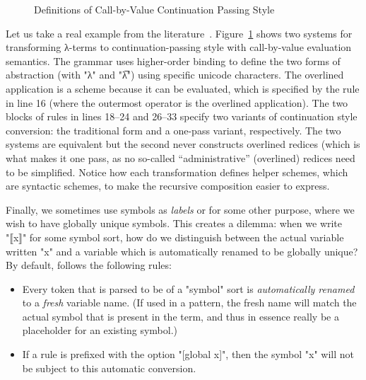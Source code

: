 \documentclass[11pt]{article} %
\begin{document}
\begin{figure}[p]
  \caption{Definitions of Call-by-Value Continuation Passing Style}
  \label{fig:cps}
\end{figure}

\begin{example}
  Let us take a real example from the literature~\cite{DanvyRose:rta1998}.  Figure~\ref{fig:cps}
  shows two systems for transforming λ-terms to continuation-passing style with call-by-value
  evaluation semantics. The grammar uses higher-order binding to define the two forms of abstraction
  (with "λ" and "λ̅") using specific unicode characters. The overlined application is a scheme
  because it can be evaluated, which is specified by the rule in line 16 (where the outermost
  operator is the overlined application). The two blocks of rules in lines 18--24 and 26--33 specify
  two variants of continuation style conversion: the traditional form and a one-pass variant,
  respectively. The two systems are equivalent but the second never constructs overlined redices
  (which is what makes it one pass, as no so-called ``administrative'' (overlined) redices need to
  be simplified. Notice how each transformation defines helper schemes, which are syntactic schemes,
  to make the recursive composition easier to express.
\end{example}

Finally, we sometimes use symbols as \emph{labels} or for some other purpose, where we wish to have
globally unique symbols. This creates a dilemma: when we write "⟦x⟧" for some symbol sort, how do we
distinguish between the actual variable written "x" and a variable which is automatically renamed to
be globally unique? By default, \HAX follows the following rules:
\begin{itemize}

\item Every token that is parsed to be of a "symbol" sort is \emph{automatically renamed} to a
  \emph{fresh} variable name. (If used in a pattern, the fresh name will match the actual symbol
  that is present in the term, and thus in essence really be a placeholder for an existing symbol.)

\item If a rule is prefixed with the option "[global x]", then the symbol "x" will not be subject to
  this automatic conversion.

\end{itemize}
\end{document}
